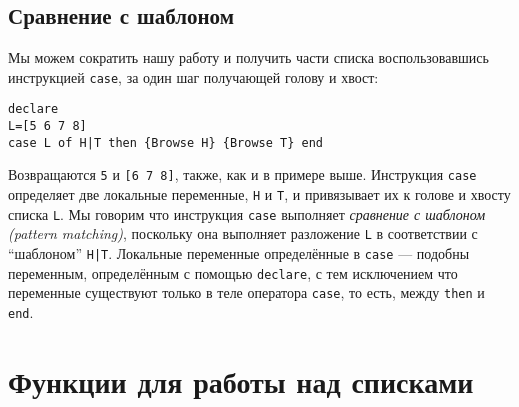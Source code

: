 \subsection{Сравнение с шаблоном}\label{Pattern_Matching}

Мы можем сократить нашу работу и получить части списка воспользовавшись инструкцией \lstinline|case|, за один шаг получающей голову и хвост:

\begin{lstlisting}
declare
L=[5 6 7 8]
case L of H|T then {Browse H} {Browse T} end
\end{lstlisting}

Возвращаются \lstinline|5| и \lstinline|[6 7 8]|, также, как и в примере выше. Инструкция \lstinline|case| определяет две локальные переменные, \lstinline|H| и \lstinline|T|, и привязывает их к голове и хвосту списка \lstinline|L|. Мы говорим что инструкция \lstinline|case| выполняет \emph{сравнение с шаблоном (pattern matching)}, поскольку она выполняет разложение \lstinline|L| в соответствии с ``шаблоном'' \lstinline!H|T!. Локальные переменные определённые в \lstinline|case| --- подобны переменным, определённым с помощью \lstinline|declare|, с тем исключением что переменные существуют только в теле оператора \lstinline|case|, то есть, между \lstinline|then| и \lstinline|end|.

\section{Функции для работы над списками}\label{section_functions_over_lists}

